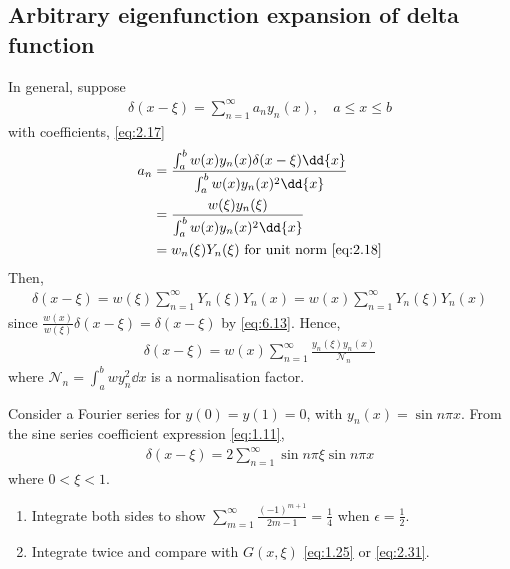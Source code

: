 \subsection{Arbitrary eigenfunction expansion of delta function}
In general, suppose
\begin{align*}
	\delta(x-\xi) = \sum_{n=1}^\infty a_n y_n(x),\quad a \leq x \leq b
\end{align*}
with coefficients, \cref{eq:2.17}
\begin{align*}
	a_n &= \frac{\int_a^b w(x) y_n(x) \delta(x-\xi) \dd{x}}{\int_a^b w(x) y_n(x)^2 \dd{x}} 
	\\ &= \frac{w(\xi) y_n(\xi)}{\int_a^b w(x) y_n(x)^2 \dd{x}} \\
	&= w_n(\xi) Y_n(\xi) \text{ for unit norm \cref{eq:2.18}}
\end{align*}
Then,
\begin{align*}
	\delta(x-\xi) = w(\xi) \sum_{n=1}^\infty Y_n(\xi) Y_n(x) = w(x) \sum_{n=1}^\infty Y_n(\xi) Y_n(x)
\end{align*}
since $\frac{w(x)}{w(\xi)} \delta(x - \xi) = \delta(x - \xi)$ by \cref{eq:6.13}.
Hence,
\begin{align} \label{eq:6.15}
	\delta(x-\xi) = w(x) \sum_{n=1}^\infty \frac{y_n(\xi) y_n(x)}{\mathcal{N}_n}
\end{align}
where $\mathcal{N}_n = \int_a^b w y_n^2 \dd{x}$ is a normalisation factor.
\begin{example}
	Consider a Fourier series for $y(0) = y(1) = 0$, with $y_n(x) = \sin n \pi x$.
	From the sine series coefficient expression \cref{eq:1.11},
	\begin{align*}
		\delta(x-\xi) = 2\sum_{n=1}^\infty \sin n \pi \xi \sin n \pi x
	\end{align*}
	where $0 < \xi < 1$.
\end{example}

\begin{exercise}
	\begin{enumerate}
		\item Integrate both sides to show $\sum_{m=1}^{\infty} \frac{(-1)^{m+1}}{2m-1} = \frac{1}{4}$ when $\epsilon= \frac{1}{2}$.
		\item Integrate twice and compare with $G(x, \xi)$ \cref{eq:1.25} or \cref{eq:2.31}.
	\end{enumerate} 
\end{exercise} 